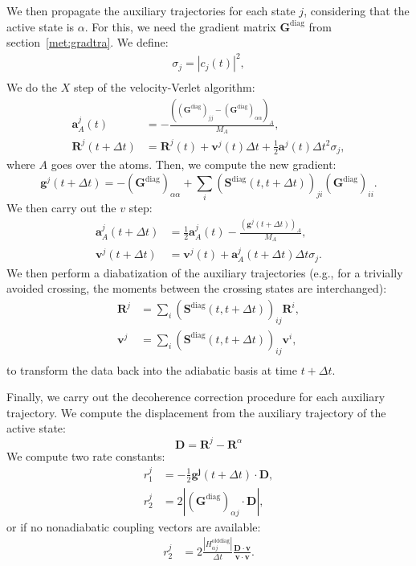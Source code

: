 \documentclass[a4paper,10pt,DIV=15,openany]{scrbook}
\newcommand{\VEC}[1]{\ensuremath{\mathbf{#1}}}
\begin{document}
We then propagate the auxiliary trajectories for each state $j$, considering that the active state is $\alpha$.
For this, we need the gradient matrix $\VEC{G}^\text{diag}$ from section~\ref{met:gradtra}.
We define:
\begin{align}
  \sigma_j=|c_j(t)|^2,\\
\end{align}
We do the $X$ step of the velocity-Verlet algorithm:
\begin{align}
  \VEC{a}^j_A(t)&=-\frac{((\VEC{G}^\text{diag})_{jj}-(\VEC{G}^\text{diag})_{\alpha\alpha})_A}{M_A},\\
  \VEC{R}^j(t+\Delta t)&= \VEC{R}^j(t)+\VEC{v}^j(t)\Delta t +\frac{1}{2}\VEC{a}^j(t)\Delta t^2\sigma_j,
\end{align}
where $A$ goes over the atoms.
Then, we compute the new gradient:
\begin{equation}
  \VEC{g}^j(t+\Delta t)=
  -(\VEC{G}^\text{diag})_{\alpha\alpha}
  +
  \sum_i(\VEC{S}^\text{diag}(t,t+\Delta t))_{ji}(\VEC{G}^\text{diag})_{ii}.
\end{equation}
We then carry out the $v$ step:
\begin{align}
  \VEC{a}^j_A(t+\Delta t)&=\frac{1}{2}\VEC{a}^j_A(t)
  -\frac{(\VEC{g}^j(t+\Delta t))_A}{M_A},\\
  \VEC{v}^j(t+\Delta t)&=\VEC{v}^j(t)+\VEC{a}^j_A(t+\Delta t)\Delta t\sigma_j.
\end{align}
We then perform a diabatization of the auxiliary trajectories (e.g., for a trivially avoided crossing, the moments between the crossing states are interchanged):
\begin{align}
  \VEC{R}^j&=\sum_i(\VEC{S}^\text{diag}(t,t+\Delta t))_{ij}\VEC{R}^i,\\
  \VEC{v}^j&=\sum_i(\VEC{S}^\text{diag}(t,t+\Delta t))_{ij}\VEC{v}^i,\\
\end{align}
to transform the data back into the adiabatic basis at time $t+\Delta t$.

Finally, we carry out the decoherence correction procedure for each auxiliary trajectory.
We compute the displacement from the auxiliary trajectory of the active state:
\begin{equation}
  \VEC{D}=\VEC{R}^j-\VEC{R}^\alpha
\end{equation}
We compute two rate constants:
\begin{align}
  r_1^j&=-\frac{1}{2}\VEC{g^j}(t+\Delta t)\cdot\VEC{D},\\
  r_2^j&=2|(\VEC{G}^\text{diag})_{\alpha j}\cdot\VEC{D}|,
\end{align}
or if no nonadiabatic coupling vectors are available:
\begin{align}
  r_2^j&=2\frac{|H^\text{olddiag}_{\alpha j}|}{\Delta t}\frac{\VEC{D}\cdot\VEC{v}}{\VEC{v}\cdot\VEC{v}}.
\end{align}
\end{document}
